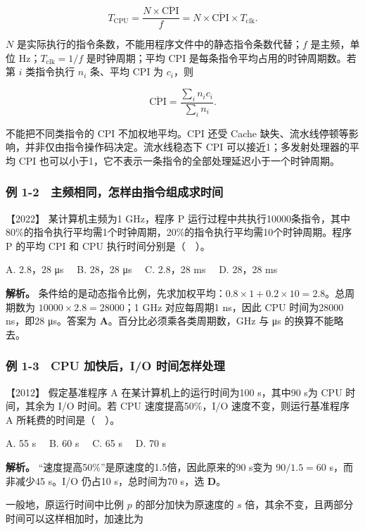 \[
T_{\mathrm{CPU}}=\frac{N\times\overline{\mathrm{CPI}}}{f}
=N\times\overline{\mathrm{CPI}}\times T_{\mathrm{clk}}.
\]

\(N\) 是实际执行的指令条数，不能用程序文件中的静态指令条数代替；\(f\) 是主频，单位 Hz；\(T_{\mathrm{clk}}=1/f\) 是时钟周期；平均 CPI 是每条指令平均占用的时钟周期数。若第 \(i\) 类指令执行 \(n_i\) 条、平均 CPI 为 \(c_i\)，则

\[
\overline{\mathrm{CPI}}=\frac{\sum_i n_i c_i}{\sum_i n_i}.
\]

不能把不同类指令的 CPI 不加权地平均。CPI 还受 Cache 缺失、流水线停顿等影响，并非仅由指令操作码决定。流水线稳态下 CPI 可以接近1；多发射处理器的平均 CPI 也可以小于1，它不表示一条指令的全部处理延迟小于一个时钟周期。

\subsubsection{例 1-2　主频相同，怎样由指令组成求时间}\label{co-ex1-2}

\noindent{}【2022】 某计算机主频为1 GHz，程序 P 运行过程中共执行10000条指令，其中80\%的指令执行平均需1个时钟周期，20\%的指令执行平均需10个时钟周期。程序 P 的平均 CPI 和 CPU 执行时间分别是（　）。

A. 2.8，28 μs　 B. 28，28 μs　 C. 2.8，28 ms　 D. 28，28 ms


\textbf{解析。} 条件给的是动态指令比例，先求加权平均：\(0.8\times1+0.2\times10=2.8\)。总周期数为 \(10000\times2.8=28000\)；1 GHz 对应每周期1 ns，因此 CPU 时间为28000 ns，即28 μs。答案为 \textbf{A}。百分比必须乘各类周期数，GHz 与 μs 的换算不能略去。

\subsubsection{例 1-3　CPU 加快后，I/O 时间怎样处理}\label{co-ex1-3}

\noindent{}【2012】 假定基准程序 A 在某计算机上的运行时间为100 s，其中90 s为 CPU 时间，其余为 I/O 时间。若 CPU 速度提高50\%，I/O 速度不变，则运行基准程序 A 所耗费的时间是（　）。

A. 55 s　 B. 60 s　 C. 65 s　 D. 70 s


\textbf{解析。} ``速度提高50\%''是原速度的1.5倍，因此原来的90 s变为 \(90/1.5=60\) s，而非减少45 s。I/O 仍占10 s，总时间为70 s，选 \textbf{D}。

一般地，原运行时间中比例 \(p\) 的部分加快为原速度的 \(s\) 倍，其余不变，且两部分时间可以这样相加时，加速比为

